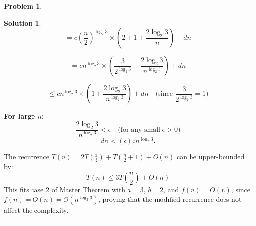 \documentclass{article}
\theoremstyle{definition}
\newtheorem{problem}{Problem}
\def\fline{\rule{0.75\linewidth}{0.5pt}}
\newcommand{\finishline}{\begin{center}\fline\end{center}}
\newtheorem*{solution*}{Solution}
\newenvironment{solution}{\begin{solution*}}{{\finishline} \end{solution*}}
\begin{document}
\begin{problem}
\begin{solution}
	\[
	= c\left(\frac{n}{2}\right)^{\log_2 3} \times \left(2 + 1 + \frac{2\log_2 3}{n}\right) + dn
	\]
	
	\[
	= cn^{\log_2 3} \times \left(\frac{3}{2^{\log_2 3}} + \frac{2\log_2 3}{n^{\log_2 3}}\right) + dn
	\]
	
	\[
	\leq cn^{\log_2 3} \times \left(1 + \frac{2\log_2 3}{n^{\log_2 3}}\right) + dn \quad \text{(since } \frac{3}{2^{\log_2 3}} = 1\text{)}
	\]
	
	\textbf{For large \( n \):}
	\[
	\frac{2\log_2 3}{n^{\log_2 3}} < \epsilon \quad \text{(for any small } \epsilon > 0\text{)}
	\]
	\[
	dn < (\epsilon)cn^{\log_2 3}.
	\]
	
	The recurrence \( T(n) = 2T\left(\frac{n}{2}\right) + T\left(\frac{n}{2} + 1\right) + O(n) \) can be upper-bounded by:
	\[
	T(n) \leq 3T\left(\frac{n}{2}\right) + O(n)
	\]
	This fits case 2 of Master Theorem with \( a = 3 \), \( b = 2 \), and \( f(n) = O(n) \), since \( f(n) = O(n) = O(n^{\log_2 3}) \), proving that the modified recurrence does not affect the complexity.
\end{solution}


\end{problem}
\end{document}
